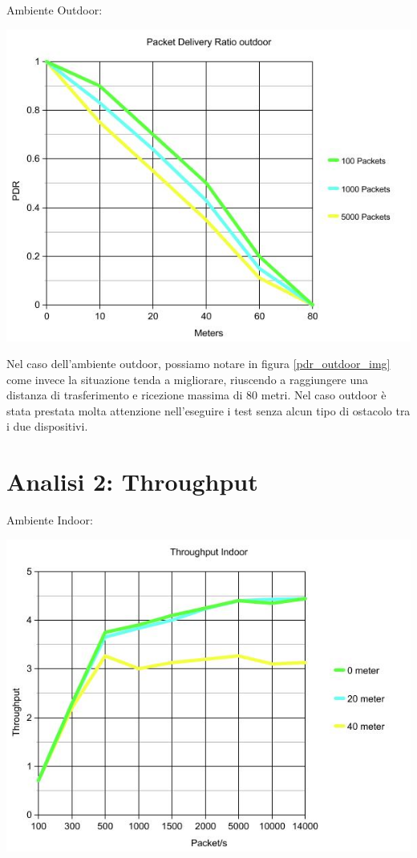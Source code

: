 Ambiente Outdoor:
\begin{center}
\includegraphics[width=1\textwidth]{imgs/PDR_Outdoor_New.jpg}
\label{pdr_outdoor_img}%
\end{center}

Nel caso dell'ambiente outdoor, possiamo notare in figura \ref{pdr_outdoor_img} come invece la situazione tenda a migliorare, riuscendo a raggiungere una distanza di trasferimento e ricezione massima di 80 metri.
Nel caso outdoor è stata prestata molta attenzione nell'eseguire i test senza alcun tipo di ostacolo tra i due dispositivi.

\section{Analisi 2: Throughput}

Ambiente Indoor:
\begin{center}
\includegraphics[width=1\textwidth]{imgs/ThroughputIndoor.jpg}
\label{throughputindoor_img}%
\end{center}

